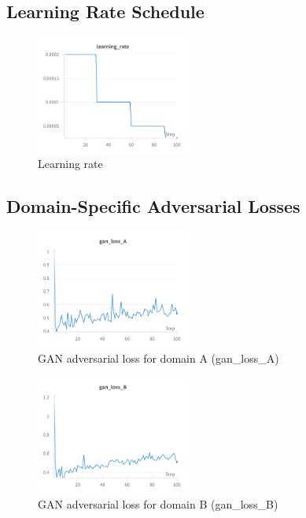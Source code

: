 \documentclass[twocolumn,superscriptaddress,aps]{revtex4-1}
\begin{document}
\subsection{Learning Rate Schedule}

\begin{figure}[H]
\centering
\includegraphics[width=0.45\textwidth]{assets/learning_rate.png}
\caption{Learning rate}
\label{fig:learning_rate}
\end{figure}

\subsection{Domain-Specific Adversarial Losses}

\begin{figure}[H]
\centering
\includegraphics[width=0.45\textwidth]{assets/gan_loss_A.png}
\caption{GAN adversarial loss for domain A (gan\_loss\_A)}
\label{fig:gan_loss_A}
\end{figure}

\begin{figure}[H]
\centering
\includegraphics[width=0.45\textwidth]{assets/gan_loss_B.png}
\caption{GAN adversarial loss for domain B (gan\_loss\_B)}
\label{fig:gan_loss_B}
\end{figure}
\end{document}
